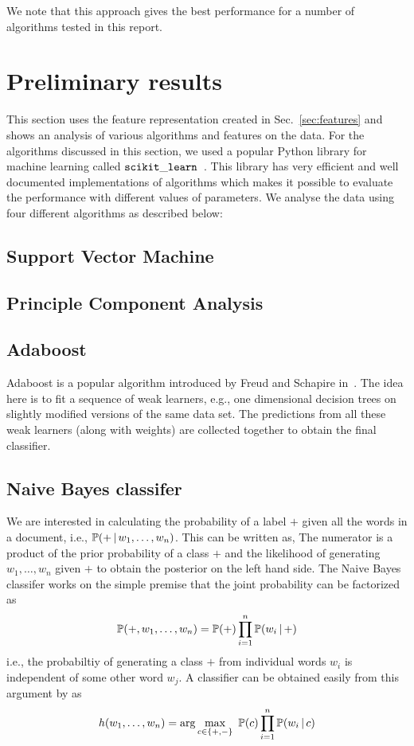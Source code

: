 \documentclass[11pt, letterpaper, conference, final, twocolumn]{ieeeconf}
\begin{document}
We note that this approach gives the best performance for a number of algorithms tested in this report.

\section{Preliminary results}
\label{sec:prelim}

This section uses the feature representation created in Sec.~\ref{sec:features} and shows an analysis of various algorithms and features on the data.
For the algorithms discussed in this section, we used a popular Python library for machine learning called $\tt scikit\_learn$~\cite{scikit-learn}. This library has very efficient and well documented implementations of algorithms which makes it possible to evaluate the performance with different values of parameters. We analyse the data using four different algorithms as described below:

\subsection{Support Vector Machine}
\label{ssec:svm}

\subsection{Principle Component Analysis}
\label{ssec:pca}


\subsection{Adaboost}
\label{ssec:adaboost}
%
Adaboost is a popular algorithm introduced by Freud and Schapire in~\cite{freund1999short}. The idea here is to fit a sequence of weak learners, e.g., one dimensional decision trees on slightly modified versions of the same data set. The predictions from all these weak learners (along with weights) are collected together to obtain the final classifier.

\subsection{Naive Bayes classifer}
\label{ssec:naive_bayes}
%
We are interested in calculating the probability of a label $+$ given all the words in a document, i.e., $\mathbb{P}(+ \, \vert \, w_1, \ldots, w_n)$. This can be written as,
The numerator is a product of the prior probability of a class $+$ and the likelihood of generating $w_1, \ldots, w_n$ given $+$ to obtain the posterior on the left hand side. The Naive Bayes classifer works on the simple premise that the joint probability can be factorized as
$$
\mathbb{P}(+, w_1, \ldots, w_n) = \mathbb{P}(+) \prod_{i=1}^n \mathbb{P}(w_i \, \vert \, +)
$$
i.e., the probabiltiy of generating a class $+$ from individual words $w_i$ is independent of some other word $w_j$. A classifier can be obtained easily from this argument by as
$$
h(w_1, \ldots, w_n) = \arg \max_{c \in \{ +, - \} }\ \mathbb{P}(c) \prod_{i=1}^n \mathbb{P}(w_i \, \vert \, c)
$$
\end{document}
